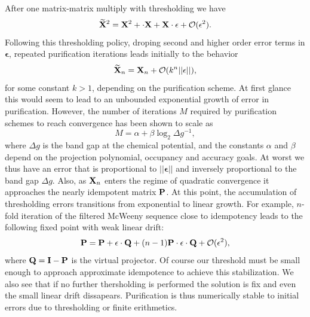 \commentoutA{\documentclass[prb,aps,twocolumn,twocolumngrid,secnumarabic,superbib,hyperref]{revtex4}}
\begin{document}
After one matrix-matrix multiply with thresholding we have
\begin{equation}
{\widetilde{ \bf X}}^2 = {\bf X}^2 + \bm{\epsilon}\cdot {\bf X} +{\bf X} 
\cdot \bm{\epsilon}+{\cal O}(\bm{\epsilon}^2).
\end{equation}
Following this thresholding policy, droping second and higher order error terms in $\bm\epsilon$, 
repeated purification iterations leads initially to the behavior
\begin{equation}
{\widetilde{\bf{ X}}}_n  = {\bf X}_n + {\cal O}(  k^n ||\bm{\epsilon}||),
\end{equation}
for some constant $k>1$, depending on the purification scheme.
At first glance this would seem to lead to an unbounded exponential growth of error in purification. 
However, the number of iterations $M$ required by purification schemes to reach convergence has been
shown to scale as \cite{Niklasson02b}
\begin{equation}
\label{Mlog}
M = \alpha + \beta \log_2 \Delta g^{-1},
\end{equation}
where $\Delta g$ is the band gap at the chemical potential, and
the constants $\alpha$ and $\beta$ depend on the projection polynomial, occupancy and accuracy goals.
At worst we thus have an error that is proportional to $||\bm{\epsilon}||$ and inversely
proportional to the band gap $\Delta g$.
Also, as ${\bf X}_n$ enters the regime of quadratic convergence it approaches 
the nearly idempotent matrix $\bf P$.  At this point, the accumulation 
of thresholding errors transitions from exponential to linear growth. 
For example,  $n$-fold iteration of the filtered McWeeny sequence 
close to idempotency leads to the following
fixed point with weak linear drift:
\begin{equation}
{\bf P}={\bf P}+\bm{\epsilon} \cdot {\bf Q}+ (n-1){\bf P}\cdot \bm{\epsilon} \cdot{\bf Q} 
+ {\cal O}(\bm{\epsilon}^2),
\end{equation}
where ${\bf Q}={\bf I}-{\bf P}$ is the virtual projector.
Of course our threshold must be small enough to approach approximate idempotence to achieve
this stabilization. We also see that if no further thersholding is performed
the solution is fix and even the small linear drift dissapears.
Purification is thus numerically stable to initial errors due to thresholding
or finite erithmetics.
\end{document}
